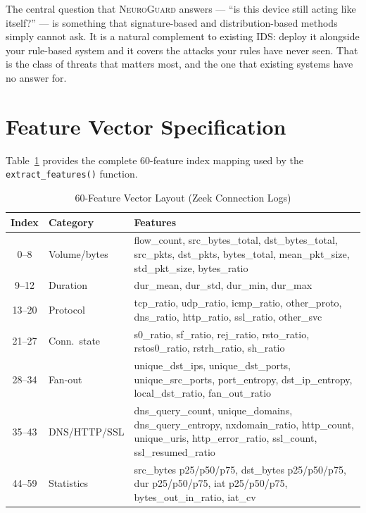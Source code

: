 \documentclass[journal,10pt,twoside]{IEEEtran}
\newcommand{\neuroguard}{\textsc{NeuroGuard}}
\begin{document}
The central question that \neuroguard{} answers --- ``is this device still
acting like itself?'' --- is something that signature-based and
distribution-based methods simply cannot ask.
It is a natural complement to existing IDS: deploy it alongside your
rule-based system and it covers the attacks your rules have never seen.
That is the class of threats that matters most, and the one that existing
systems have no answer for.

\appendix
\section{Feature Vector Specification}
\label{app:features}

Table~\ref{tab:features} provides the complete 60-feature index mapping used
by the \texttt{extract\_features()} function.

\begin{table}[!t]
  \caption{60-Feature Vector Layout (Zeek Connection Logs)}
  \label{tab:features}
  \centering
  \small
  \begin{tabular}{clp{4.2cm}}
    \toprule
    Index & Category & Features \\
    \midrule
    0--8   & Volume/bytes  & flow\_count, src\_bytes\_total, dst\_bytes\_total,
                             src\_pkts, dst\_pkts, bytes\_total,
                             mean\_pkt\_size, std\_pkt\_size, bytes\_ratio \\
    9--12  & Duration      & dur\_mean, dur\_std, dur\_min, dur\_max \\
    13--20 & Protocol      & tcp\_ratio, udp\_ratio, icmp\_ratio, other\_proto,
                             dns\_ratio, http\_ratio, ssl\_ratio, other\_svc \\
    21--27 & Conn.\ state  & s0\_ratio, sf\_ratio, rej\_ratio, rsto\_ratio,
                             rstos0\_ratio, rstrh\_ratio, sh\_ratio \\
    28--34 & Fan-out       & unique\_dst\_ips, unique\_dst\_ports,
                             unique\_src\_ports, port\_entropy,
                             dst\_ip\_entropy, local\_dst\_ratio,
                             fan\_out\_ratio \\
    35--43 & DNS/HTTP/SSL  & dns\_query\_count, unique\_domains,
                             dns\_query\_entropy, nxdomain\_ratio,
                             http\_count, unique\_uris, http\_error\_ratio,
                             ssl\_count, ssl\_resumed\_ratio \\
    44--59 & Statistics    & src\_bytes p25/p50/p75, dst\_bytes p25/p50/p75,
                             dur p25/p50/p75, iat p25/p50/p75,
                             bytes\_out\_in\_ratio, iat\_cv \\
    \bottomrule
  \end{tabular}
\end{table}
\end{document}
